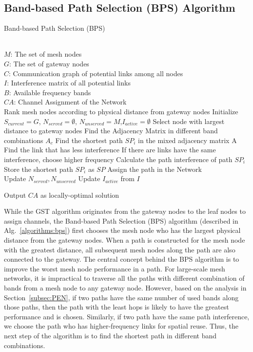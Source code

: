 \subsection{Band-based Path Selection (BPS) Algorithm}
\label{subsec:BPS}

\begin{algorithm}[t]
    \small
\caption{Band-based Path Selection (BPS)}
\label{algorithms:bps}
\begin{algorithmic}[1]
\REQUIRE  ~~\\
	$M$: The set of mesh nodes\\
	$G$: The set of gateway nodes\\
	$C$: Communication graph of potential links among all nodes\\
	$I$: Interference matrix of all potential links \\
	$B$: Available frequency bands
\ENSURE ~~\\    
$CA$: Channel Assignment of the Network\\
\STATE Rank mesh nodes according to physical distance from gateway nodes
\STATE Initialize $S_{current}=G$, $N_{served}=\emptyset$, $N_{unserved}=M$,$I_{active}=\emptyset$
\STATE Select node with largest distance to gateway nodes
\STATE Find the Adjacency Matrix in different band combinations $A_c$
\STATE Find the shortest path $SP_i$ in the mixed adjacency matrix A 
\STATE Find the link that has less interference
\STATE If there are links have the same interference, choose higher frequency
\STATE Calculate the path interference of path $SP_i$
\ENDFOR
\STATE Store the shortest path $SP_i$ as $SP$
\ENDFOR
\STATE Assign the path in the Network\\
		\STATE Update $N_{served},N_{unserved}$
		\STATE Update $I_{active}$ from $I$
\ENDWHILE 

Output $CA$ as locally-optimal solution\\
\end{algorithmic}
\end{algorithm}

While the GST algorithm originates from the gateway nodes to the leaf
nodes to assign channels, the Band-based Path Selection (BPS) algorithm
(described in Alg.~\ref{algorithms:bps}) first chooses the mesh node who has the largest
physical distance from the gateway nodes. When a path is constructed for
the mesh node with the greatest distance, all subsequent mesh nodes along
the path are also connected to the gateway. The central concept behind the
BPS algorithm is to improve the worst mesh node performance in a path.
For large-scale mesh networks, it is impractical to traverse all the paths with
different combination of bands from a mesh node to any gateway node. However,
based on the analysis in Section~\ref{subsec:PEN}, if two paths have the same
number of used bands along those paths, then the path with the least hops
is likely to have the greatest performance and is chosen.  Similarly, if
two path have the same path interference, we choose the path who has
higher-frequency links for spatial reuse. Thus, the next step of the
algorithm is to find the shortest path in different band combinations.

